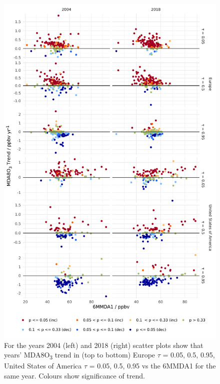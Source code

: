 \documentclass{article}
\begin{document}
\begin{figure}[p]
\centering
\includegraphics[height=0.75\textheight]{figures/si_figures/fS22_mda8_sig_mda8_6mmda1.pdf}
\caption{For the years 2004 (left) and 2018 (right) scatter plots show that years' MDA8O\textsubscript{3} trend in (top to bottom) Europe $\tau$ = 0.05, 0.5, 0.95, United States of America $\tau$ = 0.05, 0.5, 0.95 vs the 6MMDA1 for the same year. Colours show significance of trend.}
\label{si_fig:mda8_sig_mda8_6mmda1}
\end{figure}
\clearpage
\end{document}
